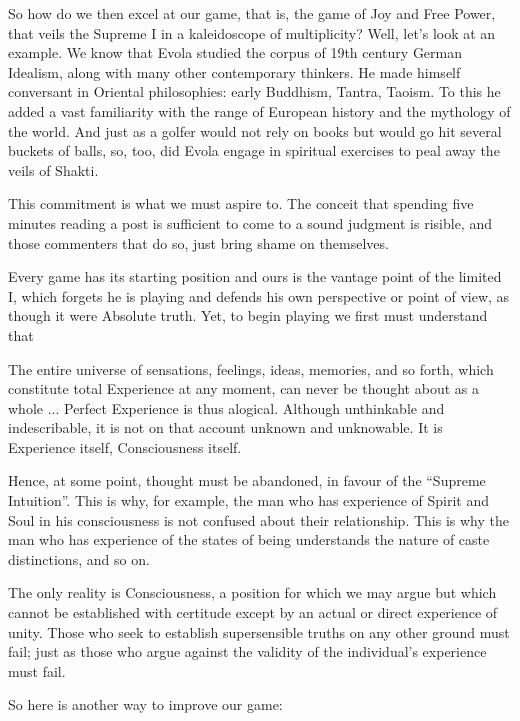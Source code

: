 So how do we then excel at our game, that is, the game of Joy and Free Power, that veils the Supreme I in a kaleidoscope of multiplicity? Well, let's look at an example. We know that Evola studied the corpus of 19th century German Idealism, along with many other contemporary thinkers. He made himself conversant in Oriental philosophies: early Buddhism, Tantra, Taoism. To this he added a vast familiarity with the range of European history and the mythology of the world. And just as a golfer would not rely on books but would go hit several buckets of balls, so, too, did Evola engage in spiritual exercises to peal away the veils of Shakti.

This commitment is what we must aspire to. The conceit that spending five minutes reading a post is sufficient to come to a sound judgment is risible, and those commenters that do so, just bring shame on themselves.

Every game has its starting position and ours is the vantage point of the limited I, which forgets he is playing and defends his own perspective or point of view, as though it were Absolute truth. Yet, to begin playing we first must understand that

\begin{quotex}
The entire universe of sensations, feelings, ideas, memories, and so forth, which constitute total Experience at any moment, can never be thought about as a whole ... Perfect Experience is thus alogical. Although unthinkable and indescribable, it is not on that account unknown and unknowable. It is Experience itself, Consciousness itself.
\end{quotex}


Hence, at some point, thought must be abandoned, in favour of the ``Supreme Intuition''. This is why, for example, the man who has experience of Spirit and Soul in his consciousness is not confused about their relationship. This is why the man who has experience of the states of being understands the nature of caste distinctions, and so on.

\begin{quotex}
The only reality is Consciousness, a position for which we may argue but which cannot be established with certitude except by an actual or direct experience of unity. Those who seek to establish supersensible truths on any other ground must fail; just as those who argue against the validity of the individual's experience must fail.
\end{quotex}


So here is another way to improve our game:

